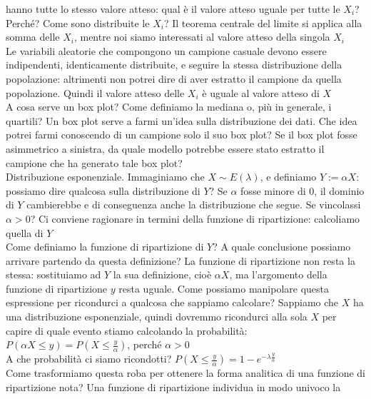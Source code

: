 \documentclass{article}
\begin{document}
    hanno tutte lo stesso valore atteso: qual è il valore atteso uguale per tutte le $ X_i $? Perché? Come sono distribuite le $ X_i $? Il teorema centrale del limite si
    applica alla somma delle $ X_i $, mentre noi siamo interessati al valore atteso della singola $ X_i $ \\
    Le variabili aleatorie che compongono un campione casuale devono essere indipendenti, identicamente distribuite, e seguire la stessa distribuzione della popolazione: 
    altrimenti non potrei dire di aver estratto il campione da quella popolazione. Quindi il valore atteso delle $ X_i $ è uguale al valore atteso di $ X $ \\
    
    A cosa serve un box plot? Come definiamo la mediana o, più in generale, i quartili? Un box plot serve a farmi un'idea sulla distribuzione dei dati. Che idea potrei farmi
    conoscendo di un campione solo il suo box plot? Se il box plot fosse asimmetrico a sinistra, da quale modello potrebbe essere stato estratto il campione che ha generato
    tale box plot? \\
    Distribuzione esponenziale. Immaginiamo che $ X \sim E ( \lambda ) $, e definiamo $ Y := \alpha X $: possiamo dire qualcosa sulla distribuzione di $ Y $? Se $ \alpha $
    fosse minore di $ 0 $, il dominio di $ Y $ cambierebbe e di conseguenza anche la distribuzione che segue. Se vincolassi $ \alpha > 0 $? Ci conviene ragionare in termini
    della funzione di ripartizione: calcoliamo quella di $ Y $ \\
    Come definiamo la funzione di ripartizione di $ Y $? A quale conclusione possiamo arrivare partendo da questa definizione? La funzione di ripartizione non resta la stessa:
    sostituiamo ad $ Y $ la sua definizione, cioè $ \alpha X $, ma l'argomento della funzione di ripartizione $ y $ resta uguale. Come possiamo manipolare questa espressione
    per ricondurci a qualcosa che sappiamo calcolare? Sappiamo che $ X $ ha una distribuzione esponenziale, quindi dovremmo ricondurci alla sola $ X $ per capire di quale
    evento stiamo calcolando la probabilità: $ P ( \alpha X \leq y ) = P \left ( X \leq \frac{ y }{ \alpha } \right ) $, perché $ \alpha > 0 $ \\
    A che probabilità ci siamo ricondotti? $ P \left ( X \leq \frac{ y }{ \alpha } \right ) = 1 - e^{ - \lambda \frac{ y }{ \alpha }} $ \\
    Come trasformiamo questa roba per ottenere la forma analitica di una funzione di ripartizione nota? Una funzione di ripartizione individua in modo univoco la
\end{document}
